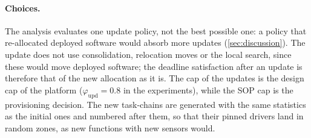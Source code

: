 \paragraph{Choices.} The analysis evaluates one update policy, not the
best possible one: a policy that re-allocated deployed software would
absorb more updates (\cref{sec:discussion}). The update does not use consolidation,
relocation moves or the local search, since these would move deployed
software; the deadline satisfaction after an update is therefore that of
the new allocation as it is. The cap of the updates is the design cap of
the platform ($\varphi_{\mathrm{upd}}=0.8$ in the experiments), while the
SOP cap is the provisioning decision. The new task-chains are generated
with the same statistics as the initial ones and numbered after them, so
that their pinned drivers land in random zones, as new functions with new
sensors would.
